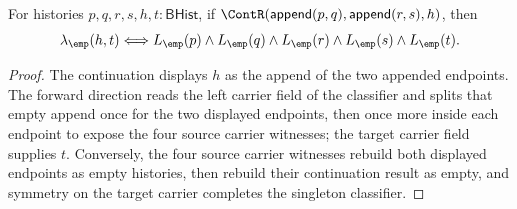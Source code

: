 \begin{theorem}
\label{thm:linearmap-singleton-classifier-continuation-append-pair-classifier-iff}
For histories $p,q,r,s,h,t:\mathsf{BHist}$, if
$\ContR(\mathsf{append}(p,q),\mathsf{append}(r,s),h)$, then
$$
\lambda_{\emp}(h,t)
\Longleftrightarrow
L_{\emp}(p)\wedge L_{\emp}(q)\wedge L_{\emp}(r)\wedge
L_{\emp}(s)\wedge L_{\emp}(t).
$$
\end{theorem}
\begin{proof}
The continuation displays $h$ as the append of the two appended endpoints.
The forward direction reads the left carrier field of the classifier and
splits that empty append once for the two displayed endpoints, then once more
inside each endpoint to expose the four source carrier witnesses; the target
carrier field supplies $t$. Conversely, the four source carrier witnesses
rebuild both displayed endpoints as empty histories, then rebuild their
continuation result as empty, and symmetry on the target carrier completes the
singleton classifier.
\end{proof}
